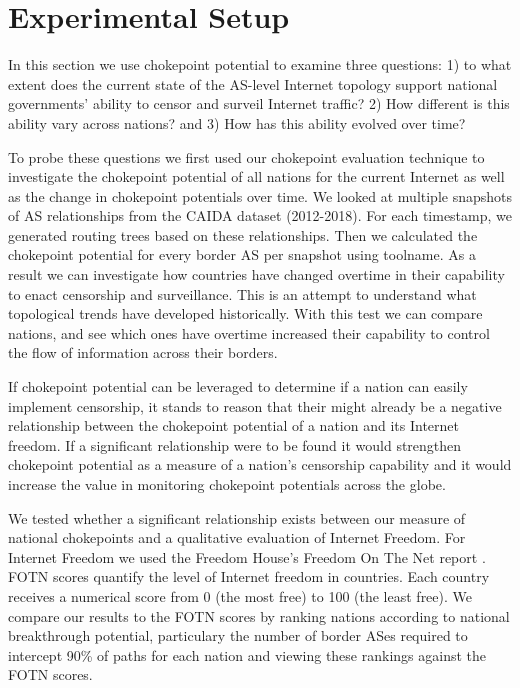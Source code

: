 \section{Experimental Setup}
\label{sec:exp}


In this section we use chokepoint potential to examine three questions: 1) to
what extent does the current state of the AS-level Internet topology support
national governments' ability to censor and surveil Internet traffic? 2) How
different is this ability vary across nations? and 3)  How has this ability
evolved over time?

To probe these questions we first used our chokepoint evaluation technique to
investigate the chokepoint potential of all nations for the current Internet as
well as the change in chokepoint potentials over time. We looked at multiple
snapshots of AS relationships from the CAIDA dataset (2012-2018).  For each
timestamp, we generated routing trees based on these relationships. Then we
calculated the chokepoint potential for every border AS per snapshot using
toolname{}. As a result we can investigate how countries have changed overtime
in their capability to enact censorship and surveillance. This is an attempt to
understand what topological trends have developed historically.  With this test
we can compare nations, and see which ones have overtime increased their
capability to control the flow of information across their borders.

If chokepoint potential can be leveraged to determine if a nation can easily
implement censorship, it stands to reason that their might already be a
negative relationship between the chokepoint potential of a nation and its
Internet freedom. If a significant relationship were to be found it would
strengthen chokepoint potential as a measure of a nation's censorship
capability and it would increase the value in monitoring chokepoint potentials
across the globe.

We tested whether a significant relationship exists between our measure of
national chokepoints and a qualitative evaluation of Internet Freedom. For
Internet Freedom we used the Freedom House's Freedom On The Net report
\cite{FOTN}. FOTN scores quantify the level of Internet freedom in countries.
Each country receives a numerical score from 0 (the most free) to 100 (the
least free). We compare our results to the FOTN scores by ranking nations
according to national breakthrough potential, particulary the number of border
ASes required to intercept 90\% of paths for each nation and viewing these
rankings against the FOTN scores.
